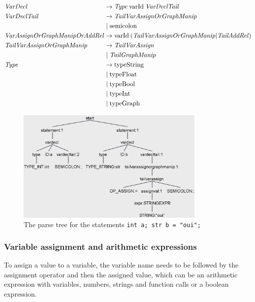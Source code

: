 \begin{align*}
    \omit $\mathit{VarDecl}$ \hfil& \rightarrow \mathit{Type} \: \text{varId} \: \mathit{VarDeclTail} \\
    \omit $\mathit{VarDeclTail}$ \hfil & \rightarrow \mathit{TailVarAssignOrGraphManip} \\
    & \mid \text{semicolon} \\
    \omit $\mathit{VarAssignOrGraphManipOrAddRel}$\hfil & \rightarrow \text{varId} \: ( \mathit{TailVarAssignOrGraphManip} |  \mathit{TailAddRel})\\
    \omit $\mathit{TailVarAssignOrGraphManip}$ & \rightarrow \mathit{TailVarAssign} \\
    & \mid  \mathit{TailGraphManip}\ \\
    \omit $\mathit{Type}$ \hfil & \rightarrow \text{typeString} \\
    & \mid \text{typeFloat} \\
    & \mid \text{typeBool} \\
    & \mid \text{typeInt}\\
    & \mid \text{typeGraph}
\end{align*}

\begin{figure}[H]
    \centering
    \includegraphics[height = 5.5cm]{figures/parse_trees/parseTree_varDecl}
    \caption{The parse tree for the statements \texttt{int a;
    str b = "oui";}}
    \label{fig:parseTree_varDecl}
\end{figure}

\subsubsection*{Variable assignment and arithmetic expressions}
To assign a value to a variable, the variable name needs to be followed by the assignment operator and then the assigned value, which can be an arithmetic expression with variables, numbers, strings and function calls or a boolean expression.

